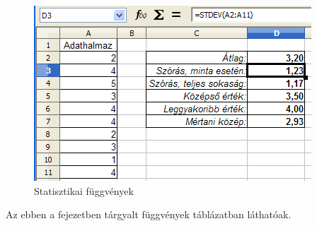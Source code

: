 \begin{figure}[!h]
\begin{center}
\includegraphics[width=10.37cm]{oocalcv1-img129.png}
\caption{Statisztikai függvények}\label{StatisztikaiFüggvények2}
\end{center}
\end{figure}

Az ebben a fejezetben tárgyalt függvények 
táblázatban láthatóak.

